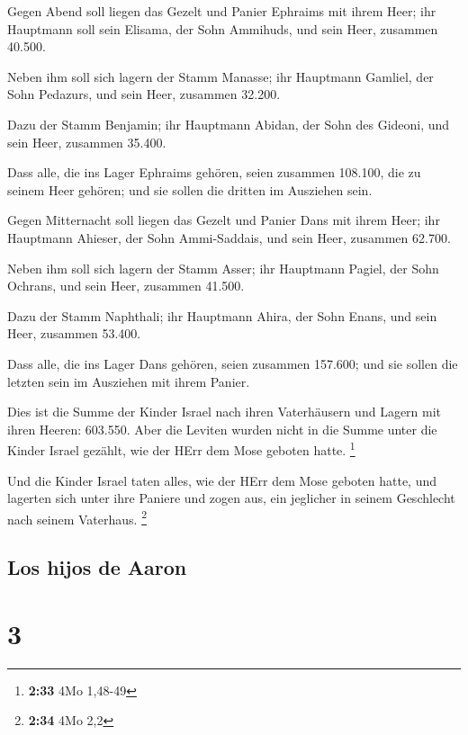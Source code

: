  Gegen Abend soll liegen das Gezelt und Panier Ephraims
mit ihrem Heer; ihr Hauptmann soll sein Elisama, der Sohn Ammihuds,
 und sein Heer, zusammen 40.500.

 Neben ihm soll sich lagern der Stamm Manasse; ihr
Hauptmann Gamliel, der Sohn Pedazurs,  und sein Heer,
zusammen 32.200.

 Dazu der Stamm Benjamin; ihr Hauptmann Abidan, der Sohn
des Gideoni,  und sein Heer, zusammen 35.400.

 Dass alle, die ins Lager Ephraims gehören, seien
zusammen 108.100, die zu seinem Heer gehören; und sie sollen die dritten
im Ausziehen sein.

 Gegen Mitternacht soll liegen das Gezelt und Panier Dans
mit ihrem Heer; ihr Hauptmann Ahieser, der Sohn Ammi-Saddais,
 und sein Heer, zusammen 62.700.

 Neben ihm soll sich lagern der Stamm Asser; ihr
Hauptmann Pagiel, der Sohn Ochrans,  und sein Heer,
zusammen 41.500.

 Dazu der Stamm Naphthali; ihr Hauptmann Ahira, der Sohn
Enans,  und sein Heer, zusammen 53.400.

 Dass alle, die ins Lager Dans gehören, seien zusammen
157.600; und sie sollen die letzten sein im Ausziehen mit ihrem Panier.

 Dies ist die Summe der Kinder Israel nach ihren
Vaterhäusern und Lagern mit ihren Heeren: 603.550.  Aber
die Leviten wurden nicht in die Summe unter die Kinder Israel gezählt,
wie der HErr dem Mose geboten hatte. \footnote{\textbf{2:33} 4Mo 1,48-49}

 Und die Kinder Israel taten alles, wie der HErr dem Mose
geboten hatte, und lagerten sich unter ihre Paniere und zogen aus, ein
jeglicher in seinem Geschlecht nach seinem Vaterhaus. \footnote{\textbf{2:34}
  4Mo 2,2}

\hypertarget{los-hijos-de-aaron}{%
\subsection{Los hijos de Aaron}\label{los-hijos-de-aaron}}

\hypertarget{section-2}{%
\section{3}\label{section-2}}

